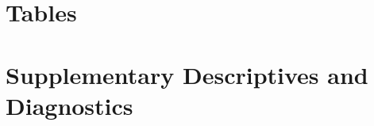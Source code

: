\documentclass[11pt]{article}
\begin{document}


\clearpage
\section*{Tables}































\clearpage
\appendix
\setcounter{table}{0}
\setcounter{figure}{0}
\renewcommand{\thetable}{A\arabic{table}}
\renewcommand{\thefigure}{A\arabic{figure}}

\section{Supplementary Descriptives and Diagnostics}
\end{document}
